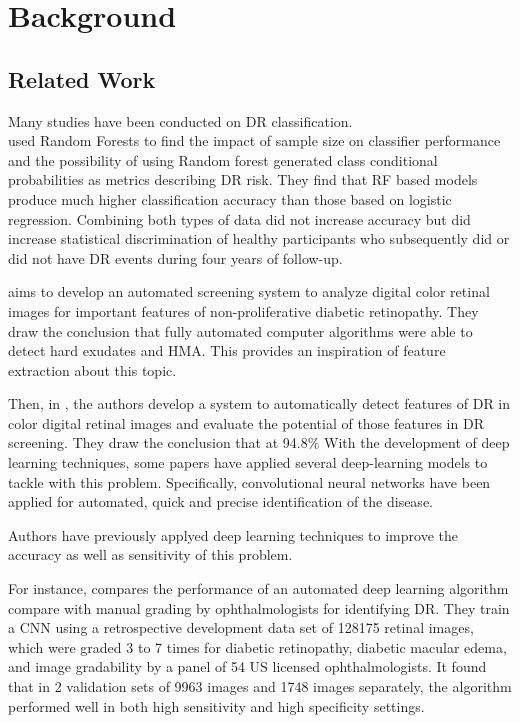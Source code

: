 \section{Background}
\subsection{Related Work}
Many studies have been conducted on DR classification.\\
\cite{1} used Random Forests to find the impact of sample size on classifier performance and the possibility of using Random forest generated class conditional probabilities as metrics describing DR risk. They find that RF based models produce much higher classification accuracy than those based on logistic regression. Combining both types of data did not increase accuracy but did increase statistical discrimination of healthy participants who subsequently did or did not have DR events during four years of follow-up.

\cite{2} aims to develop an automated screening system to analyze digital color retinal images for important features of non-proliferative diabetic retinopathy. They draw the conclusion that fully automated computer algorithms were able to detect hard exudates and HMA. This provides an inspiration of feature extraction about this topic.

Then, in \cite{3}, the authors develop a system to automatically detect features of DR in color digital retinal images and evaluate the potential of those features in DR screening. They draw the conclusion that at 94.8$\%$ 
With the development of deep learning techniques, some papers have applied several deep-learning models to tackle with this problem. Specifically, convolutional neural networks have been applied for automated, quick and precise identification of the disease.

Authors have previously applyed deep learning techniques to improve the accuracy as well as sensitivity of this problem.

For instance, \cite{4} compares the performance of an automated deep learning algorithm compare with manual grading by ophthalmologists for identifying DR. They train a CNN using a retrospective development data set of 128175 retinal images, which were graded 3 to 7 times for diabetic retinopathy, diabetic macular edema, and image gradability by a panel of 54 US licensed ophthalmologists. It found that in 2 validation sets of 9963 images and 1748 images separately, the algorithm performed well in both high sensitivity and high specificity settings.

